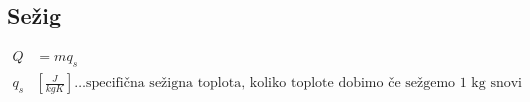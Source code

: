{\color{indiagreen}\subsection{Sežig}}
\begin{align*}
	Q &= m q_s\\
	q_s &[\frac{J}{kgK}]\dots \text{specifična sežigna toplota, koliko toplote dobimo če sežgemo 1 kg snovi}\\
\end{align*}